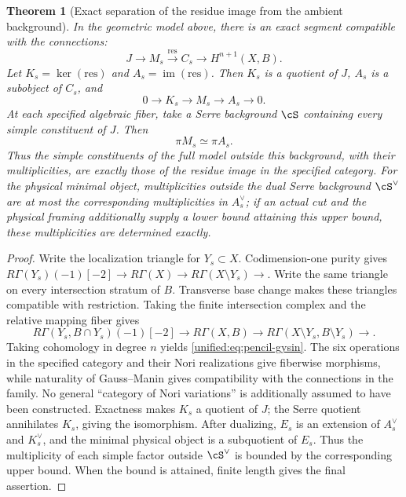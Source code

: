 \documentclass[11pt,a4paper,oneside]{article}
\theoremstyle{plain}
\newtheorem{theorem}{Theorem}[section]
\theoremstyle{definition}
\theoremstyle{remark}
\newcommand{\im}{\operatorname{im}}
\numberwithin{equation}{section}
\begin{document}
\begin{theorem}[Exact separation of the residue image from the ambient background]\label{unified:thm:pencil-separation}
In the geometric model above, there is an exact segment compatible with the connections:
\begin{equation}\label{unified:eq:pencil-gysin}
 J\longrightarrow M_s\xrightarrow{\mathrm{res}}C_s
       \longrightarrow H^{n+1}(X,B).
\end{equation}
Let $K_s=\ker(\mathrm{res})$ and $A_s=\im(\mathrm{res})$.
Then $K_s$ is a quotient of $J$, $A_s$ is a subobject of $C_s$, and
\[
 0\longrightarrow K_s\longrightarrow M_s\longrightarrow A_s
 \longrightarrow0.
\]
At each specified algebraic fiber, take a Serre background $\cS$ containing every simple constituent of $J$. Then
\[
 \pi M_s\simeq\pi A_s.
\]
Thus the simple constituents of the full model outside this background, with their multiplicities, are exactly those of the residue image in the specified category.
For the physical minimal object, multiplicities outside the dual Serre background $\cS^\vee$ are at most the corresponding multiplicities in $A_s^\vee$;
if an actual cut and the physical framing additionally supply a lower bound attaining this upper bound, these multiplicities are determined exactly.
\end{theorem}
\begin{proof}
Write the localization triangle for $Y_s\subset X$. Codimension-one purity gives
$R\Gamma(Y_s)(-1)[-2]\to R\Gamma(X)\to
R\Gamma(X\setminus Y_s)\to$.
Write the same triangle on every intersection stratum of $B$.
Transverse base change makes these triangles compatible with restriction. Taking the finite intersection complex and the relative mapping fiber gives
\[
 R\Gamma(Y_s,B\cap Y_s)(-1)[-2]\longrightarrow
 R\Gamma(X,B)\longrightarrow
 R\Gamma(X\setminus Y_s,B\setminus Y_s)\longrightarrow.
\]
Taking cohomology in degree $n$ yields \eqref{unified:eq:pencil-gysin}.
The six operations in the specified category and their Nori realizations give fiberwise morphisms, while naturality of Gauss--Manin gives compatibility with the connections in the family.
No general ``category of Nori variations'' is additionally assumed to have been constructed.
Exactness makes $K_s$ a quotient of $J$; the Serre quotient annihilates $K_s$, giving the isomorphism.
After dualizing, $E_s$ is an extension of $A_s^\vee$ and $K_s^\vee$,
and the minimal physical object is a subquotient of $E_s$. Thus the multiplicity of each simple factor outside $\cS^\vee$ is bounded by the corresponding upper bound.
When the bound is attained, finite length gives the final assertion.
\end{proof}
\end{document}
